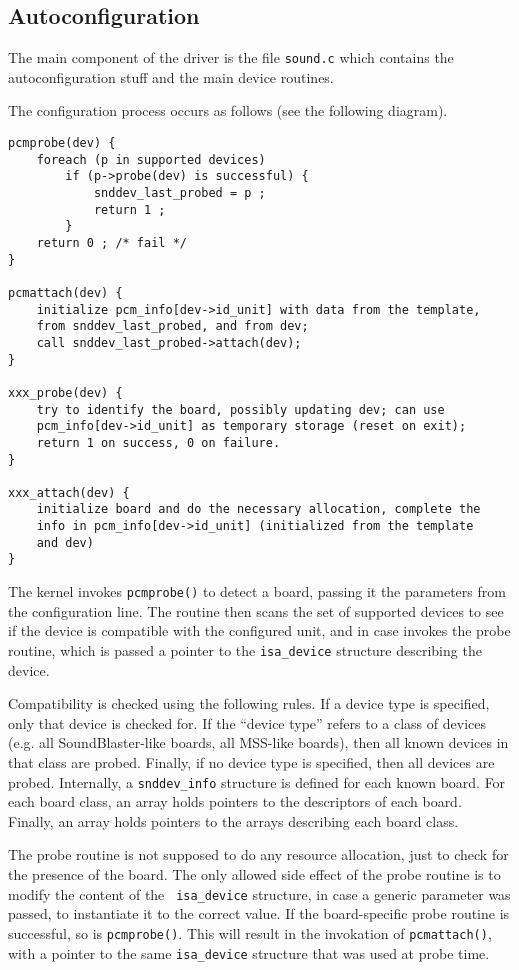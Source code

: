 \documentclass[11pt]{article}
\begin{document}
\subsection{Autoconfiguration}

The main component of the driver is the file {\tt sound.c} which
contains the autoconfiguration stuff and the main device routines.

The configuration process occurs as follows (see the following
diagram).

\begin{verbatim}
pcmprobe(dev) {
    foreach (p in supported devices)
        if (p->probe(dev) is successful) {
            snddev_last_probed = p ;
            return 1 ;
        }
    return 0 ; /* fail */
}

pcmattach(dev) {
    initialize pcm_info[dev->id_unit] with data from the template,
    from snddev_last_probed, and from dev;
    call snddev_last_probed->attach(dev);
}

xxx_probe(dev) {
    try to identify the board, possibly updating dev; can use
    pcm_info[dev->id_unit] as temporary storage (reset on exit);
    return 1 on success, 0 on failure.
}

xxx_attach(dev) {
    initialize board and do the necessary allocation, complete the
    info in pcm_info[dev->id_unit] (initialized from the template
    and dev)
}
\end{verbatim}
The kernel invokes {\tt pcmprobe()} to detect a board, passing it
the parameters from the configuration line. The routine then scans
the set of supported devices to see if the device is compatible
with the configured unit, and in case invokes the probe routine,
which is passed a pointer to the {\tt isa\_device} structure
describing the device.

Compatibility is checked using the following rules. If a device
type is specified, only that device is checked for.  If the ``device
type'' refers to a class of devices (e.g. all SoundBlaster-like
boards, all MSS-like boards), then all known devices in that class
are probed. Finally, if no device type is specified, then all
devices are probed.  Internally, a {\tt snddev\_info} structure is
defined for each known board. For each board class, an array holds
pointers to the descriptors of each board. Finally, an array holds
pointers to the arrays describing each board class.

The probe routine is not supposed to do any resource allocation,
just to check for the presence of the board. The only allowed side
effect of the probe routine is to modify the content of the {\tt
isa\_device} structure, in case a generic parameter was passed, to
instantiate it to the correct value.  If the board-specific probe
routine is successful, so is {\tt pcmprobe()}. This will result in
the invokation of {\tt pcmattach()}, with a pointer to the same
{\tt isa\_device} structure that was used at probe time.
\end{document}
